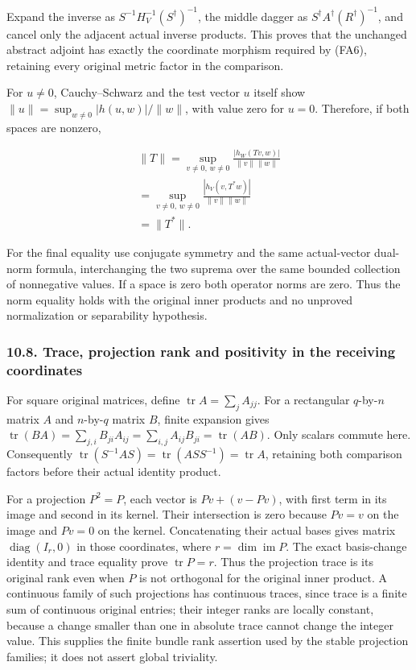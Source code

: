 \documentclass[
  11pt,
]{article}
\begin{document}
Expand the inverse as \(S^{-1}H_V^{-1}(S^\dagger)^{-1}\), the middle
dagger as \(S^\dagger A^\dagger(R^\dagger)^{-1}\), and cancel only the
adjacent actual inverse products. This proves that the unchanged
abstract adjoint has exactly the coordinate morphism required by (FA6),
retaining every original metric factor in the comparison.

For \(u\ne0\), Cauchy--Schwarz and the test vector \(u\) itself show
\(\|u\|=\sup_{w\ne0}|h(u,w)|/\|w\|\), with value zero for \(u=0\).
Therefore, if both spaces are nonzero,

\[
\begin{gathered}
\|T\|=\sup_{v\ne0,\,w\ne0}
 \frac{|h_W(Tv,w)|}{\|v\|\|w\|} \\ =\sup_{v\ne0,\,w\ne0}
 \frac{|h_V(v,T^*w)|}{\|v\|\|w\|} \\ =\|T^*\|.
\end{gathered}
\tag{FA27}
\]

For the final equality use conjugate symmetry and the same actual-vector
dual-norm formula, interchanging the two suprema over the same bounded
collection of nonnegative values. If a space is zero both operator norms
are zero. Thus the norm equality holds with the original inner products
and no unproved normalization or separability hypothesis.

\subsubsection{10.8. Trace, projection rank and positivity in the
receiving
coordinates}\label{trace-projection-rank-and-positivity-in-the-receiving-coordinates}

For square original matrices, define
\(\operatorname{tr}A=\sum_jA_{jj}\). For a rectangular \(q\)-by-\(n\)
matrix \(A\) and \(n\)-by-\(q\) matrix \(B\), finite expansion gives
\(\operatorname{tr}(BA)=\sum_{j,i}B_{ji}A_{ij}=\sum_{i,j}A_{ij}B_{ji}=\operatorname{tr}(AB)\).
Only scalars commute here. Consequently
\(\operatorname{tr}(S^{-1}AS)=\operatorname{tr}(ASS^{-1})=\operatorname{tr}A\),
retaining both comparison factors before their actual identity product.

For a projection \(P^2=P\), each vector is \(Pv+(v-Pv)\), with first
term in its image and second in its kernel. Their intersection is zero
because \(Pv=v\) on the image and \(Pv=0\) on the kernel. Concatenating
their actual bases gives matrix \(\operatorname{diag}(I_r,0)\) in those
coordinates, where \(r=\dim\operatorname{im}P\). The exact basis-change
identity and trace equality prove \(\operatorname{tr}P=r\). Thus the
projection trace is its original rank even when \(P\) is not orthogonal
for the original inner product. A continuous family of such projections
has continuous traces, since trace is a finite sum of continuous
original entries; their integer ranks are locally constant, because a
change smaller than one in absolute trace cannot change the integer
value. This supplies the finite bundle rank assertion used by the stable
projection families; it does not assert global triviality.
\end{document}
